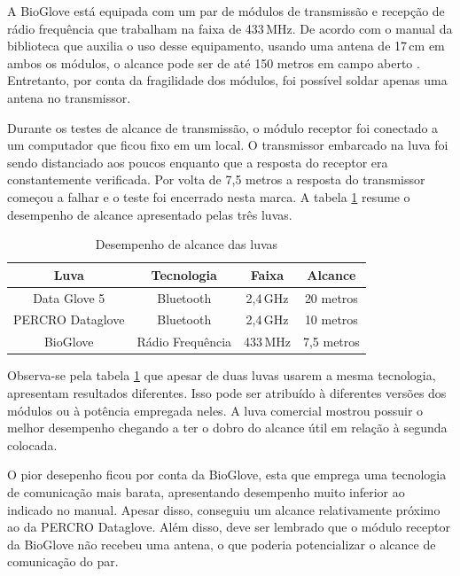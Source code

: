 \documentclass[
	12pt,				%
	openright,			%
	oneside,			%
	a4paper,			%
	english,			%
	brazil				%
	]{abntex2}
\begin{document}
			A BioGlove está equipada com um par de módulos de transmissão e recepção de rádio frequência que trabalham na faixa de 433$\,$MHz. De acordo com o manual da biblioteca que auxilia o uso desse equipamento, usando uma antena de 17$\,$cm em ambos os módulos, o alcance pode ser de até 150 metros em campo aberto \cite{virtualwiremanual}. Entretanto, por conta da fragilidade dos módulos, foi possível soldar apenas uma antena no transmissor.

			Durante os testes de alcance de transmissão, o módulo receptor foi conectado a um computador que ficou fixo em um local. O transmissor embarcado na luva foi sendo distanciado aos poucos enquanto que a resposta do receptor era constantemente verificada. Por volta de 7,5 metros a resposta do transmissor começou a falhar e o teste foi encerrado nesta marca. A tabela \ref{Tab:wifi-range} resume o desempenho de alcance apresentado pelas três luvas.

		\begin{table}[H]
  	\centering
		\caption{Desempenho de alcance das luvas}
    \begin{tabular}{c|c|c|c}
      \midrule
			Luva 						& Tecnologia			&	Faixa		& Alcance		\\
      \midrule                                            					
			Data Glove 5		& Bluetooth				& 2,4$\,$GHz	& 20 metros	\\
			PERCRO Dataglove& Bluetooth				& 2,4$\,$GHz	& 10 metros	\\
			BioGlove				& Rádio Frequência& 433$\,$MHz	&	7,5 metros\\	
      \midrule
    \end{tabular}
		\label{Tab:wifi-range}
		\end{table}

			Observa-se pela tabela \ref{Tab:wifi-range} que apesar de duas luvas usarem a mesma tecnologia, apresentam resultados diferentes. Isso pode ser atribuído à diferentes versões dos módulos ou à potência empregada neles. A luva comercial mostrou possuir o melhor desempenho chegando a ter o dobro do alcance útil em relação à segunda colocada.

			O pior desepenho ficou por conta da BioGlove, esta que emprega uma tecnologia de comunicação mais barata, apresentando desempenho muito inferior ao indicado no manual. Apesar disso, conseguiu um alcance relativamente próximo ao da PERCRO Dataglove. Além disso, deve ser lembrado que o módulo receptor da BioGlove não recebeu uma antena, o que poderia potencializar o alcance de comunicação do par.
\end{document}

